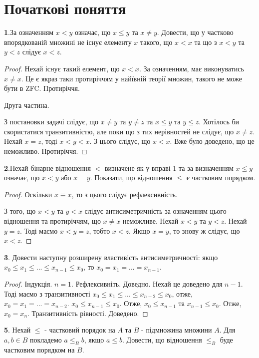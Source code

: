 \documentclass{article}
\begin{document}
\section{Початкові поняття}
\textbf{1}.За означенням $x < y$ означає, що $x \leq y$ та $x \not=y$. Довести, що у частково впорядкованій множині не існує елементу $x$ такого, що $x < x$ та що з $x < y$ та $y < z$ слідує $x < z$.

\begin{proof} Нехай існує такий елемент, що $x < x$. За означенням, має виконуватись $x \not= x$. Це є якраз таки протиріччям у найївній теорії множин, такого не може бути в ZFC. Протиріччя.
    
Друга частина.

З постановки задачі слідує, що $x \neq y$ та $y \neq z$ та $x \leq y$ та $y \leq z$. Хотілось би скористатися транзитивністю, але поки що з тих нерівностей не слідує, що $x \neq z$. Нехай $x = z$, тоді $x < y <x$. З цього слідує, що $x < x$. Вже було доведено, що це неможливо. Протиріччя. 
\end{proof}

\textbf{2}.Нехай бінарне відношення $<$ визначене як у вправі 1 та за визначенням $x \leq y$ означає, що $x < y$ або $x = y$. Показати, що відношення $\leq$ є частковим порядком.
\begin{proof}
    Оскільки $x \equiv x$, то з цього слідує рефлексивність.

З того, що $x < y$ та $y < x$ слідує антисиметричність за означенням цього відношення та протиріччям, що $x \neq x$ неможливе. Нехай $x < y$ та $y < z$. Нехай $y = z$. Тоді маємо $x < y = z$, тобто $x < z$. Якщо $x = y$, то знову ж слідує, що $x < z$.
\end{proof}

\textbf{3}. Довести наступну розширену властивість антисиметричності:
якщо $ x_0\leq x_1 \leq ... \leq x_{n-1} \leq x_0$, то $x_0 = x_1 = ... = x_{n-1}$.

\begin{proof}
    Індукція. $n = 1$. Рефлексивніть. Доведно.
    Нехай це доведено для $n-1$. Тоді маємо з транзитивності $ x_0 \leq x_1 \leq ... \leq x_{n-2} \leq x_0$, отже,   $x_0 = x_1 = ... = x_{n-2}$. $x_0 \leq x_{n-1} \leq x_0$. Отже, $x_0 \leq x_{n-1}$ та $x_{n-1} \leq x_0$. Отже, $x_0 = x_{n}$. Транзитивність рівності. Доведено. 
\end{proof}
\textbf{5}. Нехай $\leq$ - частковий порядок на $A$ та $B$ - підмножина множини $A$. Для $a,b \in B$ покладемо $a \leq_B b$, якщо $a \leq b$. Довести, що відношення $\leq_B$ буде частковим порядком на $B$.
\end{document}
